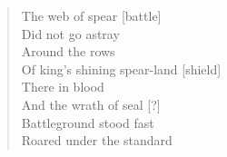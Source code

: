 \begin{paracol}{2}
\begin{quote}
    The web of spear [battle]\\
    Did not go astray \\
    Around the rows\\
    Of king's shining spear-land [shield]\\
    There in blood\\
    And the wrath of seal [?]\\
    Battleground stood fast\\
    Roared under the standard
  \end{quote}
\end{paracol}
\begin{translation*}{}
  \begin{parcolumns}[nofirstindent=true]{3}

\end{parcolumns}
\end{translation*}
